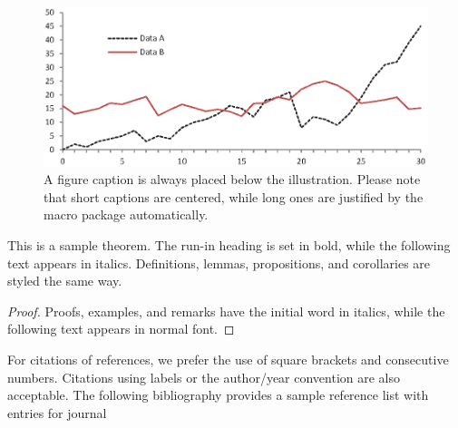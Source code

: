\documentclass[runningheads]{llncs}
\begin{document}
\begin{figure}
\includegraphics[width=\textwidth]{fig1.eps}
\caption{A figure caption is always placed below the illustration.
Please note that short captions are centered, while long ones are
justified by the macro package automatically.} \label{fig1}
\end{figure}

\begin{theorem}
This is a sample theorem. The run-in heading is set in bold, while
the following text appears in italics. Definitions, lemmas,
propositions, and corollaries are styled the same way.
\end{theorem}
%
%
\begin{proof}
Proofs, examples, and remarks have the initial word in italics,
while the following text appears in normal font.
\end{proof}
For citations of references, we prefer the use of square brackets
and consecutive numbers. Citations using labels or the author/year
convention are also acceptable. The following bibliography provides
a sample reference list with entries for journal
%
%


\nocite{*}

\end{document}
